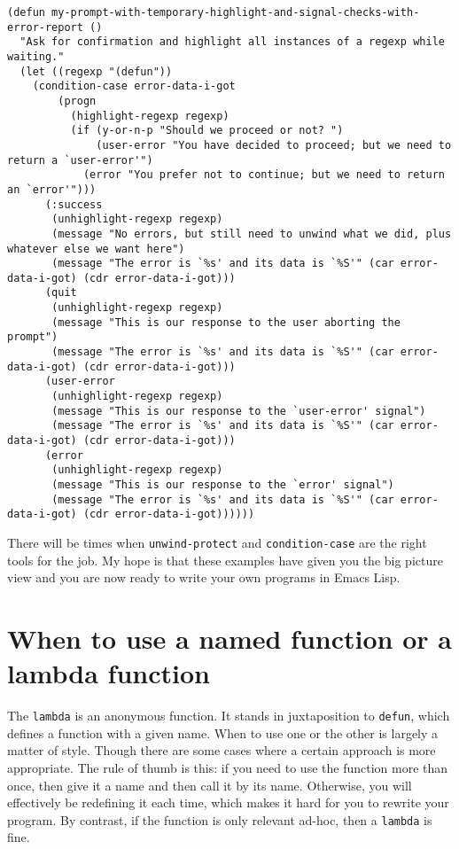 \documentclass[11pt]{ctexart}
\begin{document}
\begin{verbatim}
(defun my-prompt-with-temporary-highlight-and-signal-checks-with-error-report ()
  "Ask for confirmation and highlight all instances of a regexp while waiting."
  (let ((regexp "(defun"))
    (condition-case error-data-i-got
        (progn
          (highlight-regexp regexp)
          (if (y-or-n-p "Should we proceed or not? ")
              (user-error "You have decided to proceed; but we need to return a `user-error'")
            (error "You prefer not to continue; but we need to return an `error'")))
      (:success
       (unhighlight-regexp regexp)
       (message "No errors, but still need to unwind what we did, plus whatever else we want here")
       (message "The error is `%s' and its data is `%S'" (car error-data-i-got) (cdr error-data-i-got)))
      (quit
       (unhighlight-regexp regexp)
       (message "This is our response to the user aborting the prompt")
       (message "The error is `%s' and its data is `%S'" (car error-data-i-got) (cdr error-data-i-got)))
      (user-error
       (unhighlight-regexp regexp)
       (message "This is our response to the `user-error' signal")
       (message "The error is `%s' and its data is `%S'" (car error-data-i-got) (cdr error-data-i-got)))
      (error
       (unhighlight-regexp regexp)
       (message "This is our response to the `error' signal")
       (message "The error is `%s' and its data is `%S'" (car error-data-i-got) (cdr error-data-i-got))))))
\end{verbatim}

There will be times when \texttt{unwind-protect} and \texttt{condition-case} are the right tools for the job. My hope is that these examples have given you the big picture view and you are now ready to write your own programs in Emacs Lisp.
\section{When to use a named function or a lambda function}
\label{sec:org1669468}
The \texttt{lambda} is an anonymous function. It stands in juxtaposition to \texttt{defun}, which defines a function with a given name. When to use one or the other is largely a matter of style. Though there are some cases where a certain approach is more appropriate. The rule of thumb is this: if you need to use the function more than once, then give it a name and then call it by its name. Otherwise, you will effectively be redefining it each time, which makes it hard for you to rewrite your program. By contrast, if the function is only relevant ad-hoc, then a \texttt{lambda} is fine.
\end{document}
